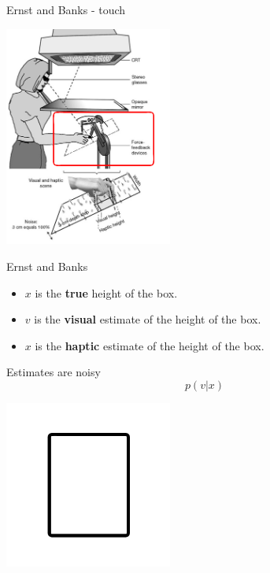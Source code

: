 \documentclass{beamer}
\newcommand{\crish}{\color{reddish}}
\newcommand{\cbla}{\color{black}}
\newcommand{\cred}{\color{red}}
\newcommand{\cblu}{\color{blue}}
\begin{document}
\begin{frame}{Ernst and Banks - touch}
\begin{center}
\includegraphics[width=5.5cm]{fig_ernstbanks_haptic.png}
\end{center}
\vfill
\end{frame}

\begin{frame}{Ernst and Banks}
  \begin{itemize}
  \item \crish$x$\cbla{} is the \textbf{true} height of the box.
  \item \cblu$v$\cbla{} is the \cblu\textbf{visual}\cbla{} estimate of the height of the box.
  \item \cred$x$\cbla{} is the \cred\textbf{haptic}\cbla{} estimate of the height of the box.
  \end{itemize}
\vfill
{}
\end{frame}

\begin{frame}{Estimates are noisy}
\crish$$p(v|x)$$\cbla{} 
  \begin{center}
\includegraphics[width=5.5cm]{box.png}
\end{center}
\end{frame}
\end{document}
